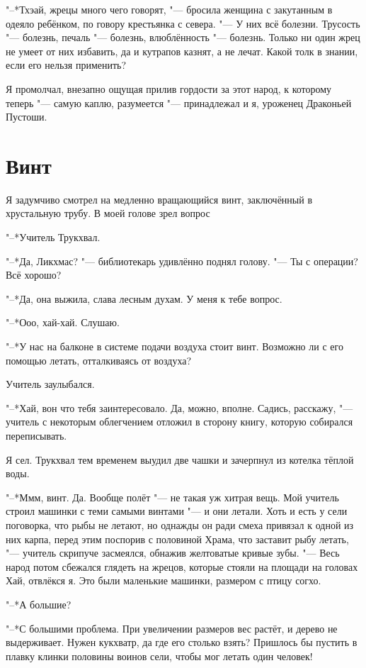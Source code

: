 "--*Тхэай, жрецы много чего говорят, "--- бросила женщина с закутанным в одеяло ребёнком, по говору крестьянка с севера.
"--- У них всё болезни.
Трусость "--- болезнь, печаль "--- болезнь, влюблённость "--- болезнь.
Только ни один жрец не умеет от них избавить, да и кутрапов казнят, а не лечат.
Какой толк в знании, если его нельзя применить?

Я промолчал, внезапно ощущая прилив гордости за этот народ, к которому теперь "--- самую каплю, разумеется "--- принадлежал и я, уроженец Драконьей Пустоши.

\section{Винт}

Я задумчиво смотрел на медленно вращающийся винт, заключённый в хрустальную трубу. В моей голове зрел вопрос\ldotst

"--*Учитель Трукхвал.

"--*Да, Ликхмас? "--- библиотекарь удивлённо поднял голову.
"--- Ты с операции?
Всё хорошо?

"--*Да, она выжила, слава лесным духам.
У меня к тебе вопрос.

"--*Ооо, хай-хай.
Слушаю.

"--*У нас на балконе в системе подачи воздуха стоит винт.
Возможно ли с его помощью летать, отталкиваясь от воздуха?

Учитель заулыбался.

"--*Хай, вон что тебя заинтересовало.
Да, можно, вполне.
Садись, расскажу, "--- учитель с некоторым облегчением отложил в сторону книгу, которую собирался переписывать.

Я сел.
Трукхвал тем временем выудил две чашки и зачерпнул из котелка тёплой воды.

"--*Ммм, винт.
Да.
Вообще полёт "--- не такая уж хитрая вещь.
Мой учитель строил машинки с теми самыми винтами "--- и они летали.
Хоть и есть у сели поговорка, что рыбы не летают, но однажды он ради смеха привязал к одной из них карпа, перед этим поспорив с половиной Храма, что заставит рыбу летать, "--- учитель скрипуче засмеялся, обнажив желтоватые кривые зубы.
"--- Весь народ потом сбежался глядеть на жрецов, которые стояли на площади на головах\ldotst
Хай, отвлёкся я.
Это были маленькие машинки, размером с птицу согхо.

"--*А большие?

"--*С большими проблема.
При увеличении размеров вес растёт, и дерево не выдерживает.
Нужен кукхватр, да где его столько взять?
Пришлось бы пустить в плавку клинки половины воинов сели, чтобы мог летать один человек!

